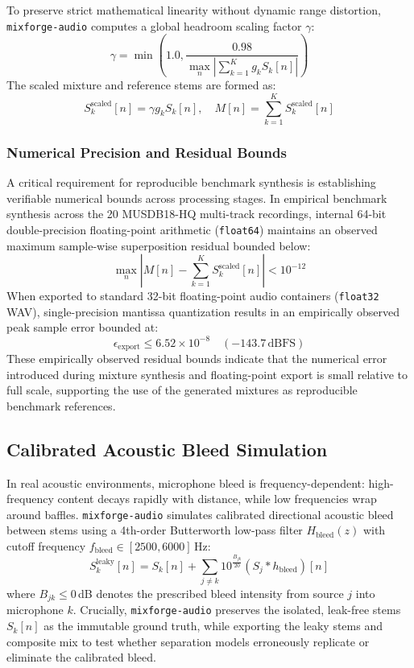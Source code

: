 \documentclass[10pt,journal,compsoc]{IEEEtran}
\begin{document}
To preserve strict mathematical linearity without dynamic range distortion, \texttt{mixforge-audio} computes a global headroom scaling factor $\gamma$:
\begin{equation}
\gamma = \min\left(1.0, \frac{0.98}{\max_n \left| \sum_{k=1}^K g_k S_k[n] \right|}\right)
\end{equation}
The scaled mixture and reference stems are formed as:
\begin{equation}
S_k^{\text{scaled}}[n] = \gamma g_k S_k[n], \quad M[n] = \sum_{k=1}^K S_k^{\text{scaled}}[n]
\end{equation}

\subsubsection{Numerical Precision and Residual Bounds}
A critical requirement for reproducible benchmark synthesis is establishing verifiable numerical bounds across processing stages. In empirical benchmark synthesis across the 20 MUSDB18-HQ multi-track recordings, internal 64-bit double-precision floating-point arithmetic (\texttt{float64}) maintains an observed maximum sample-wise superposition residual bounded below:
\begin{equation}
\max_n \left| M[n] - \sum_{k=1}^K S_k^{\text{scaled}}[n] \right| < 10^{-12}
\end{equation}
When exported to standard 32-bit floating-point audio containers (\texttt{float32} WAV), single-precision mantissa quantization results in an empirically observed peak sample error bounded at:
\begin{equation}
\epsilon_{\text{export}} \le 6.52 \times 10^{-8} \quad (-143.7\,\text{dBFS})
\end{equation}
These empirically observed residual bounds indicate that the numerical error introduced during mixture synthesis and floating-point export is small relative to full scale, supporting the use of the generated mixtures as reproducible benchmark references.

\subsection{Calibrated Acoustic Bleed Simulation}
In real acoustic environments, microphone bleed is frequency-dependent: high-frequency content decays rapidly with distance, while low frequencies wrap around baffles. \texttt{mixforge-audio} simulates calibrated directional acoustic bleed between stems using a 4th-order Butterworth low-pass filter $H_{\text{bleed}}(z)$ with cutoff frequency $f_{\text{bleed}} \in [2500, 6000]$\,Hz:
\begin{equation}
S_k^{\text{leaky}}[n] = S_k[n] + \sum_{j \ne k} 10^{\frac{B_{jk}}{20}} (S_j * h_{\text{bleed}})[n]
\end{equation}
where $B_{jk} \le 0$\,dB denotes the prescribed bleed intensity from source $j$ into microphone $k$. Crucially, \texttt{mixforge-audio} preserves the isolated, leak-free stems $S_k[n]$ as the immutable ground truth, while exporting the leaky stems and composite mix to test whether separation models erroneously replicate or eliminate the calibrated bleed.
\end{document}
